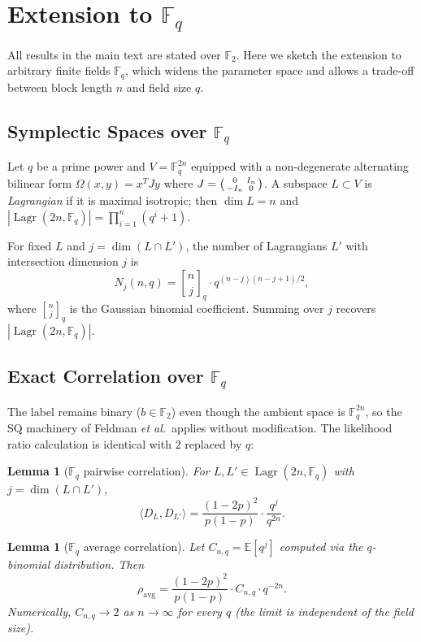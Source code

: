 \documentclass[11pt,a4paper]{article}
\theoremstyle{plain}
\newtheorem{lemma}[theorem]{Lemma}
\theoremstyle{definition}
\newcommand{\F}{\mathbb{F}}
\newcommand{\E}{\mathbb{E}}
\DeclareMathOperator{\Lagr}{Lagr}
\newcommand{\etal}{\textit{et al.}}
\begin{document}
\section{Extension to $\F_q$}
\label{app:fq}

All results in the main text are stated over $\F_2$. Here we sketch the extension to arbitrary finite fields $\F_q$, which widens the parameter space and allows a trade-off between block length $n$ and field size $q$.

\subsection{Symplectic Spaces over $\F_q$}
\label{subsec:fq-symplectic}

Let $q$ be a prime power and $V = \F_q^{2n}$ equipped with a non-degenerate alternating bilinear form $\Omega(x,y) = x^T J y$ where $J = \begin{psmallmatrix} 0 & I_n \\ -I_n & 0 \end{psmallmatrix}$. A subspace $L \subset V$ is \emph{Lagrangian} if it is maximal isotropic; then $\dim L = n$ and $|\Lagr(2n,\F_q)| = \prod_{i=1}^n (q^i+1)$.

For fixed $L$ and $j = \dim(L \cap L')$, the number of Lagrangians $L'$ with intersection dimension $j$ is
\[
N_j(n,q) = {n \brack j}_q \cdot q^{(n-j)(n-j+1)/2},
\]
where ${n \brack j}_q$ is the Gaussian binomial coefficient. Summing over $j$ recovers $|\Lagr(2n,\F_q)|$.

\subsection{Exact Correlation over $\F_q$}
\label{subsec:fq-corr}

The label remains binary ($b \in \F_2$) even though the ambient space is $\F_q^{2n}$, so the SQ machinery of Feldman \etal\ applies without modification. The likelihood ratio calculation is identical with $2$ replaced by $q$:

\begin{lemma}[$\F_q$ pairwise correlation]
\label{lem:fq-corr}
For $L,L' \in \Lagr(2n,\F_q)$ with $j = \dim(L \cap L')$,
\[
\langle D_L, D_{L'} \rangle = \frac{(1-2p)^2}{p(1-p)} \cdot \frac{q^j}{q^{2n}}.
\]
\end{lemma}

\begin{lemma}[$\F_q$ average correlation]
\label{lem:fq-avg}
Let $C_{n,q} = \E[q^j]$ computed via the $q$-binomial distribution. Then
\[
\rho_{\mathrm{avg}} = \frac{(1-2p)^2}{p(1-p)} \cdot C_{n,q} \cdot q^{-2n}.
\]
Numerically, $C_{n,q} \to 2$ as $n \to \infty$ for every $q$ (the limit is independent of the field size).
\end{lemma}
\end{document}

